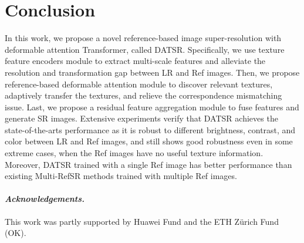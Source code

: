 \documentclass[runningheads]{llncs}
\begin{document}
\section{Conclusion}
In this work, we propose a novel reference-based image super-resolution with deformable attention Transformer, called DATSR.
Specifically, we use texture feature encoders module to extract multi-scale features and alleviate the resolution and transformation gap between LR and Ref images.
Then, we propose reference-based deformable attention module to discover relevant textures, adaptively transfer the textures, and relieve the correspondence mismatching issue. 
Last, we propose a residual feature aggregation module to fuse features and generate SR images.
Extensive experiments verify that DATSR achieves the state-of-the-arts performance as it is robust to different brightness, contrast, and color between LR and Ref images, and still shows good robustness even in some extreme cases, when the Ref images have no useful texture information.
Moreover, DATSR trained with a single Ref image has better performance than existing Multi-RefSR methods trained with multiple Ref images.

\paragraph{\textbf{\emph{Acknowledgements.}}}
This work was partly supported by Huawei Fund and the ETH Zürich Fund (OK).


\end{document}
